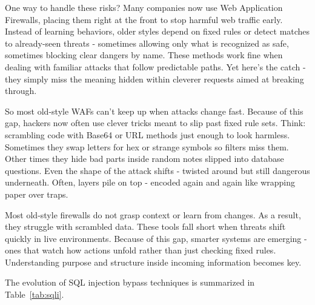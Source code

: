 \documentclass[journal,onecolumn]{IEEEtran}
\begin{document}
One way to handle these risks? Many companies now use Web Application Firewalls, placing them right at the front to stop harmful web traffic early. Instead of learning behaviors, older styles depend on fixed rules or detect matches to already-seen threats - sometimes allowing only what is recognized as safe, sometimes blocking clear dangers by name. These methods work fine when dealing with familiar attacks that follow predictable paths. Yet here's the catch - they simply miss the meaning hidden within cleverer requests aimed at breaking through.

So most old-style WAFs can't keep up when attacks change fast. Because of this gap, hackers now often use clever tricks meant to slip past fixed rule sets. Think: scrambling code with Base64 or URL methods just enough to look harmless. Sometimes they swap letters for hex or strange symbols so filters miss them. Other times they hide bad parts inside random notes slipped into database questions. Even the shape of the attack shifts - twisted around but still dangerous underneath. Often, layers pile on top - encoded again and again like wrapping paper over traps.

Most old-style firewalls do not grasp context or learn from changes. As a result, they struggle with scrambled data. These tools fall short when threats shift quickly in live environments. Because of this gap, smarter systems are emerging - ones that watch how actions unfold rather than just checking fixed rules. Understanding purpose and structure inside incoming information becomes key.

The evolution of SQL injection bypass techniques is summarized in Table~\ref{tab:sqli}.

\begin{table}[htbp]
\caption{Evolution of SQL Injection Bypass Techniques}
\label{tab:sqli}
\centering
{}
\end{table}
\end{document}
